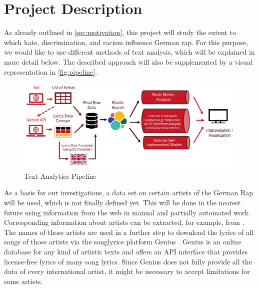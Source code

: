 \section{Project Description}\label{sec:project}

As already outlined in \autoref{sec:motivation}, this project will study the extent to which hate, discrimination, and racism influence German rap. For this purpose, we would like to use different methods of text analysis, which will be explained in more detail below. The described approach will also be supplemented by a visual representation in \autoref{fig:pipeline}.

\begin{figure}[!htb]
    \centering
    \includegraphics[width=\textwidth]{figures/pipeline.jpg}
    \caption[]{Text Analytics Pipeline}
    \label{fig:pipeline}
  \end{figure}

As a basis for our investigations, a data set on certain artists of the German Rap will be used, which is not finally defined yet. This will be done in the nearest future using information from the web in manual and partially automated work. Corresponding information about artists can be extracted, for example, from \cite{last.fm,tonspion_2021}. The names of those artists are used in a further step to download the lyrics of all songs of those artists via the songlyrics platform Genius \cite{genius}. Genius is an online database for any kind of artistic texts and offers an API interface that provides license-free lyrics of many song lyrics. Since Genius does not fully provide all the data of every international artist, it might be necessary to accept limitations for some artists.

